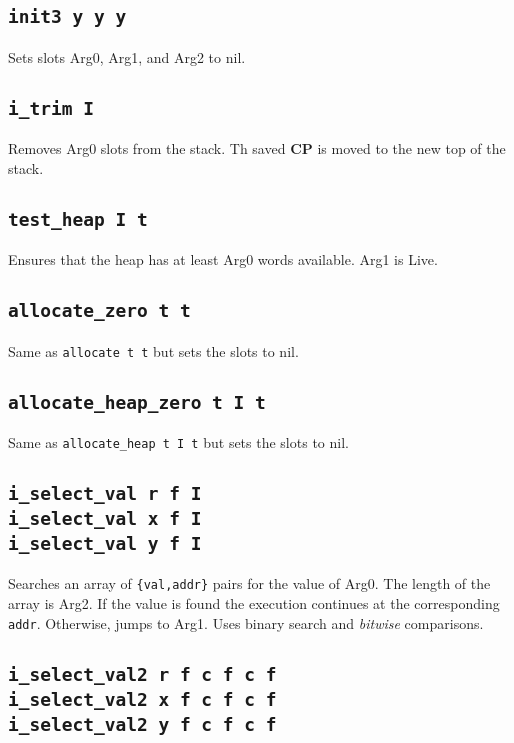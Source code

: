 \documentclass{article}
\newcommand{\cp}{\textbf{CP}}
\newcommand{\iop}[1]{\texttt{#1}}
\begin{document}
\subsection*{\iop{init3 y y y}}

Sets slots Arg0, Arg1, and Arg2 to nil.

\subsection*{\iop{i\_trim I}}

Removes Arg0 slots from the stack. Th saved \cp{} is moved to the new top of the
stack.

\subsection*{\iop{test\_heap I t}}

Ensures that the heap has at least Arg0 words available. Arg1 is Live.

\subsection*{\iop{allocate\_zero t t}}

Same as \iop{allocate t t} but sets the slots to nil.

\subsection*{\iop{allocate\_heap\_zero t I t}}

Same as \iop{allocate\_heap t I t} but sets the slots to nil.

\subsection*{\iop{i\_select\_val r f I}\\
\iop{i\_select\_val x f I}\\
\iop{i\_select\_val y f I}}

Searches an array of \verb${val,addr}$ pairs for the value of Arg0. The length
of the array is Arg2. If the value is found the execution continues at the
corresponding \verb$addr$. Otherwise, jumps to Arg1. Uses binary search and
\emph{bitwise} comparisons.

\subsection*{\iop{i\_select\_val2 r f c f c f}\\
\iop{i\_select\_val2 x f c f c f}\\
\iop{i\_select\_val2 y f c f c f}}
\end{document}
